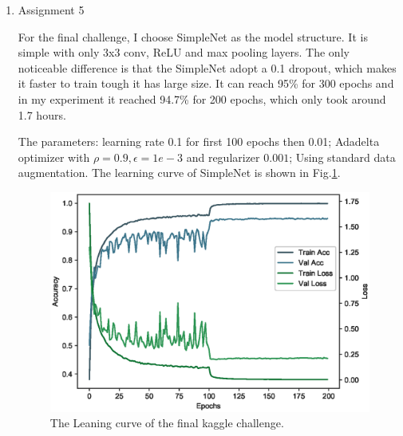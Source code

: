 \documentclass[11pt]{article}
\begin{document}
\begin{enumerate}
\item
Assignment 5

For the final challenge, I choose SimpleNet\cite{DBLP:journals/corr/HasanPourRVS16} as the model structure. It is simple with only 3x3 conv, ReLU and max pooling layers. The only noticeable difference is that the SimpleNet adopt a 0.1 dropout, which makes it faster to train tough it has large size. It can reach 95\% for 300 epochs and in my experiment it reached 94.7\% for 200 epochs, which only took around 1.7 hours.

The parameters: learning rate 0.1 for first 100 epochs then 0.01; Adadelta optimizer with $\rho=0.9, \epsilon=1e-3$ and regularizer $0.001$; Using standard data augmentation. The learning curve of SimpleNet is shown in Fig.\ref{fig:simplenet}.

\begin{figure}[h]
    \centering
    \includegraphics[width=0.6\linewidth]{learn_curve_kaggle.eps}
    \caption{The Leaning curve of the final kaggle challenge.}
    \label{fig:simplenet}
\end{figure}
\end{enumerate}



\end{document}
